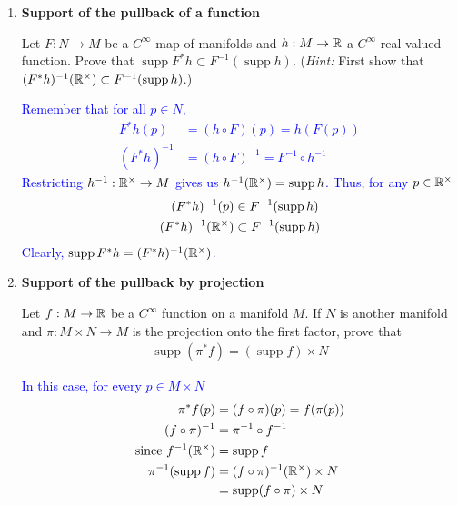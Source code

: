 \documentclass[12pt,a4paper]{report}
\newcommand{\BLUE}[1]{\textcolor{blue}{#1}}
\newcommand{\SUPP}{\operatorname{supp}}
\begin{document}
\begin{enumerate}[label=13.\arabic*]
\begin{enumerate}[label=(\alph*)]

	\item Let $A$ and $B$ be two disjoint closed sets in a manifold $M$.  Find a $C^\infty$ function $f$ on $M$ such that $r$ is identically 1 on $A$ and identically 0 on $B$.  (\textit{Hint:} Consider $C^\infty$ partition of unity $\{\rho_{M_A}, \rho_{M_B}\}$ subordinate to the open cover $\{M_A, M_B\}$.  This lemma is needed  in Subsection 29.3.)
	
	\item Let $A$ be a closed subset and $U$ an open subset of a manifold $M$.  Show that there is a $C^\infty$ function $F$ on $M$ such that $f$ is identically 1 on $A$ and $\SUPP f \subset U$.
\end{enumerate}
	
\item \textbf{Support of the pullback of a function}
	
	Let $F: N \to M$ be a $C^\infty$ map of manifolds and $h: M \to \mathbb{R}$ a $C^\infty$ real-valued function.  Prove that $\SUPP F^*h \subset F^{-1}(\SUPP h)$. (\textit{Hint:} First show that $(F^*h)^{-1}(\R^\times)\subset F^{-1}(\SUPP h)$.)
	
	\BLUE{Remember that for all $p\in N$,
	\begin{align*}
		F^*h(p) &= (h\circ F)(p) = h(F(p)) \\
		(F^*h)^{-1} &= (h\circ F)^{-1} = F^{-1}\circ h^{-1}
	\end{align*}Restricting $h^{-1}: \mathbb{R}^\times \to M$ gives us $h^{-1}(\R^\times) = \SUPP h$.  Thus, for any $p \in \mathbb{R}^\times$
	\begin{align*}
		(F^*h)^{-1}(p) &\in F^{-1}(\SUPP h) \\
		(F^*h)^{-1}(\R^\times) &\subset F^{-1}(\SUPP h) 
	\end{align*}Clearly, $\SUPP F^*h = (F^*h)^{-1}(\R^\times)$.
	}
	
\item \textbf{Support of the pullback by projection}
	
	Let $f: M \to \mathbb{R}$ be a $C^\infty$ function on a manifold $M$.  If $N$ is another manifold and $\pi: M \times N \to M$ is the projection onto the first factor, prove that 
	\begin{align*}
		\SUPP(\pi^*f)=(\SUPP f)\times N
	\end{align*}
	
	\BLUE{In this case, for every $p \in M\times N$
		\begin{align*}
			\pi^*f(p) &= (f \circ \pi)(p) = f(\pi(p)) \\
			(f \circ \pi)^{-1} &= \pi^{-1}\circ f^{-1} \\
			\text{since } f^{-1}(\R^\times) &= \SUPP f \\
			\pi^{-1}(\SUPP f) &=(f \circ \pi)^{-1}(\R^\times) \times N\\
			&= \SUPP(f\circ \pi) \times N
		\end{align*}
	}
	

\end{enumerate}
\end{document}
